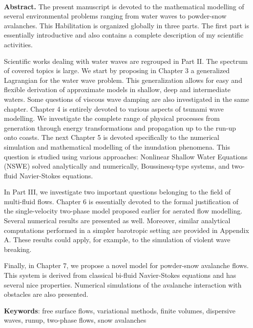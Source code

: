 \\\vspace{1em}
\textbf{Abstract.} The present manuscript is devoted to the mathematical modelling of several environmental problems ranging from water waves to powder-snow avalanches. This Habilitation is organized globally in three parts. The first part is essentially introductive and also contains a complete description of my scientific activities.

Scientific works dealing with water waves are regrouped in Part II. The spectrum of covered topics is large. We start by proposing in Chapter 3 a generalized Lagrangian for the water wave problem. This generalization allows for easy and flexible derivation of approximate models in shallow, deep and intermediate waters. Some questions of viscous wave damping are also investigated in the same chapter. Chapter 4 is entirely devoted to various aspects of tsunami wave modelling. We investigate the complete range of physical processes from generation through energy transformations and propagation up to the run-up onto coasts. The next Chapter 5 is devoted specifically to the numerical simulation and mathematical modelling of the inundation phenomena. This question is studied using various approaches: Nonlinear Shallow Water Equations (NSWE) solved analytically and numerically, Boussinesq-type systems, and two-fluid Navier-Stokes equations.

In Part III, we investigate two important questions belonging to the field of multi-fluid flows. Chapter 6 is essentially devoted to the formal justification of the single-velocity two-phase model proposed earlier for aerated flow modelling. Several numerical results are presented as well. Moreover, similar analytical computations performed in a simpler barotropic setting are provided in Appendix A. These results could apply, for example, to the simulation of violent wave breaking.

Finally, in Chapter 7, we propose a novel model for powder-snow avalanche flows. This system is derived from classical bi-fluid Navier-Stokes equations and has several nice properties. Numerical simulations of the avalanche interaction with obstacles are also presented.

\bigskip
\textbf{Keywords}: free surface flows, variational methods, finite volumes, dispersive waves, runup, two-phase flows, snow avalanches


